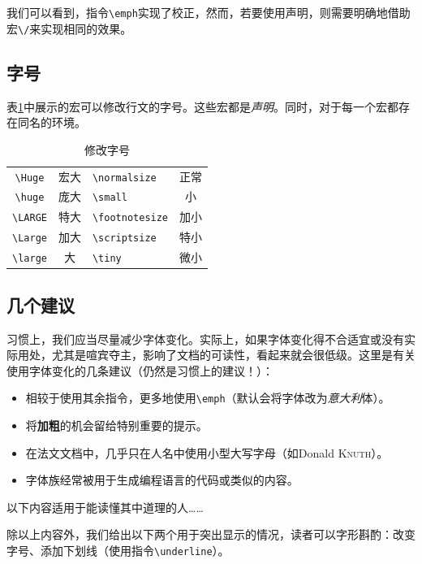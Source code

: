 我们可以看到，指令\verb|\emph|实现了校正，然而，若要使用声明，则需要明确地借助宏\verb|\/|来实现相同的效果。

\subsection{字号}

表\ref{tab:2.2}中展示的宏可以修改行文的字号。这些宏都是\emph{声明}。同时，对于每一个宏都存在同名的环境。

\begin{table}[h]
    \centering
    \begin{tabular}{|c|c||l|c|}
\hline
\verb|\Huge| & {\Huge 宏大} & \verb|\normalsize| & {正常} \\
\verb|\huge| & {\huge 庞大} & \verb|\small| & {\small 小} \\
\verb|\LARGE| & {\LARGE 特大} & \verb|\footnotesize| & {\footnotesize 加小} \\
\verb|\Large| & {\Large 加大} & \verb|\scriptsize| & {\scriptsize 特小} \\
\verb|\large| & {\large 大} & \verb|\tiny| & {\tiny 微小} \\
\hline
    \end{tabular}
    \caption{修改字号}
    \label{tab:2.2}
\end{table}

\subsection{几个建议}

习惯上，我们应当尽量减少字体变化。实际上，如果字体变化得不合适宜或没有实际用处，尤其是喧宾夺主，影响了文档的可读性，看起来就会很低级。这里是有关使用字体变化的几条建议（仍然是习惯上的建议！）：
\begin{itemize}
    \item 相较于使用其余指令，更多地使用\verb+\emph+（默认会将字体改为\emph{意大利}体）。
    \item 将\textbf{加粗}的机会留给特别重要的提示。
    \item 在法文文档中，几乎只在人名中使用小型大写字母（如Donald \textsc{Knuth}）。
    \item {}字体族经常被用于生成编程语言的代码或类似的内容。
\end{itemize}

以下内容适用于能读懂其中道理的人……

除以上内容外，我们给出以下两个用于突出显示的情况，读者可以字形斟酌：改变字号、添加下划线（使用指令\verb|\underline|）。

